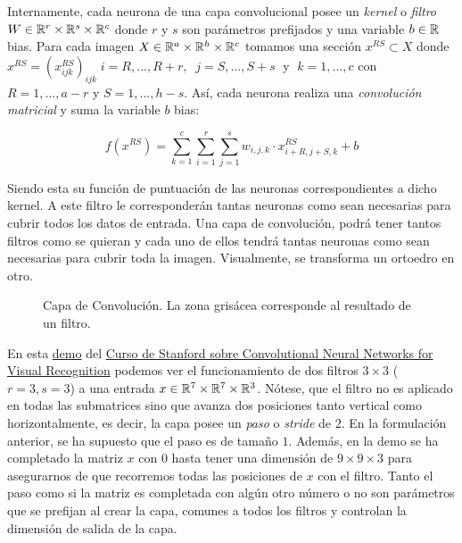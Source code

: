 Internamente, cada neurona de una capa convolucional posee un \emph{kernel} o \emph{filtro} $W\in \mathbb{R}^r \times \mathbb{R}^s \times \mathbb{R}^c$ donde $r$ y $s$ son parámetros prefijados y una variable $b\in\mathbb{R}$ bias. Para cada imagen $X \in \mathbb{R}^a \times \mathbb{R}^h \times \mathbb{R}^c$ tomamos una sección $x^{RS} \subset X$ donde $x^{RS}=(x_{ijk}^{RS})_{ijk}\; i=R,...,R+r, \;\; j=S,...,S+s\;$ y $\;k=1,...,c$ con $R=1,...,a-r$ y $S=1,...,h-s$. Así, cada neurona realiza una \emph{convolución matricial} y suma la variable $b$ bias: \newline

$$f(x^{RS})=\sum_{k=1}^{c}\sum_{i=1}^{r} \sum_{j=1}^{s} w_{i,j,k} \cdot x_{i+R,j+S,k}^{RS}+b$$

Siendo esta su función de puntuación de las neuronas correspondientes a dicho kernel. A este filtro le corresponderán tantas neuronas como sean necesarias para cubrir todos los datos de entrada. Una capa de convolución, podrá tener tantos filtros como se quieran y cada uno de ellos tendrá tantas neuronas como sean necesarias para cubrir toda la imagen. Visualmente, se transforma un ortoedro en otro.\newline

\begin{figure}
\centering


\caption{Capa de Convolución. La zona grisácea corresponde al resultado de un filtro. }
\label{fig:convolution}
\end{figure}

En esta \href{https://cs231n.github.io/assets/conv-demo/index.html}{demo} del \href{http://cs231n.stanford.edu/}{Curso de Stanford sobre Convolutional Neural Networks for Visual Recognition} podemos ver el funcionamiento de dos filtros $3\times 3$ ($r=3,s=3$) a una entrada $x\in\mathbb{R}^7\times\mathbb{R}^7\times\mathbb{R}^3$. Nótese, que el filtro no es aplicado en todas las submatrices sino que avanza dos posiciones tanto vertical como horizontalmente, es decir, la capa posee un \emph{paso} o \emph{stride} de $2$. En la formulación anterior, se ha supuesto que el paso es de tamaño $1$. Además, en la demo se ha completado la matriz $x$ con $0$ hasta tener una dimensión de $9\times 9\times 3$ para asegurarnos de que recorremos todas las posiciones de $x$ con el filtro. Tanto el paso como si la matriz es completada con algún otro número o no son parámetros que se prefijan al crear la capa, comunes a todos los filtros y controlan la dimensión de salida de la capa.


